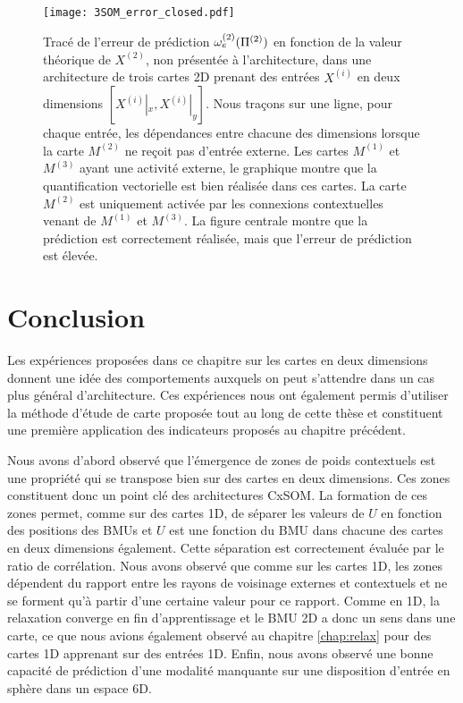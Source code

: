 \documentclass[../main]{subfiles}
\begin{document}
\begin{figure}
\centering\texttt{[image: 3SOM\_error\_closed.pdf]}
\caption{Tracé de l'erreur de prédiction $\omega_e^{({2})}(\Pi^{({2})})$ en fonction de la valeur théorique de $X^{(2)}$, non présentée à l'architecture, dans une architecture de trois cartes 2D prenant des entrées $X^{(i)}$ en deux dimensions $[X^{(i)}|_x, X^{(i)}|_y]$. Nous traçons sur une ligne, pour chaque entrée, les dépendances entre chacune des dimensions
lorsque la carte $M^{(2)}$ ne reçoit pas d'entrée externe. Les cartes $M^{(1)}$ et $M^{(3)}$ ayant une activité externe, le graphique montre que la quantification vectorielle est bien réalisée dans ces cartes. La carte $M^{(2)}$ est uniquement activée par les connexions contextuelles venant de $M^{(1)}$ et $M^{(3)}$. La figure centrale montre que la prédiction est correctement réalisée, mais que l'erreur de prédiction est élevée. \label{fig:3som_pred}}
\end{figure}


\section{Conclusion}

Les expériences proposées dans ce chapitre sur les cartes en deux dimensions donnent une idée des comportements auxquels on peut s'attendre dans un cas plus général d'architecture.
Ces expériences nous ont également permis d'utiliser la méthode d'étude de carte proposée tout au long de cette thèse et constituent une première application des indicateurs proposés au chapitre précédent.


Nous avons d'abord observé que l'émergence de zones de poids contextuels est une propriété qui se transpose bien sur des cartes en deux dimensions. Ces zones constituent donc un point clé des architectures CxSOM.
La formation de ces zones permet, comme sur des cartes 1D, de séparer les valeurs de $U$ en fonction des positions des BMUs et $U$ est une fonction du BMU dans chacune des cartes en deux dimensions également.
Cette séparation est correctement évaluée par le ratio de corrélation.
Nous avons observé que comme sur les cartes 1D, les zones dépendent du rapport entre les rayons de voisinage externes et contextuels et ne se forment qu'à partir d'une certaine valeur pour ce rapport.
Comme en 1D, la relaxation converge en fin d'apprentissage et le BMU 2D a donc un sens dans une carte, ce que nous avions également observé au chapitre \ref{chap:relax} pour des cartes 1D apprenant sur des entrées 1D.
Enfin, nous avons observé une bonne capacité de prédiction d'une modalité manquante sur une disposition d'entrée en sphère dans un espace 6D.
\end{document}
